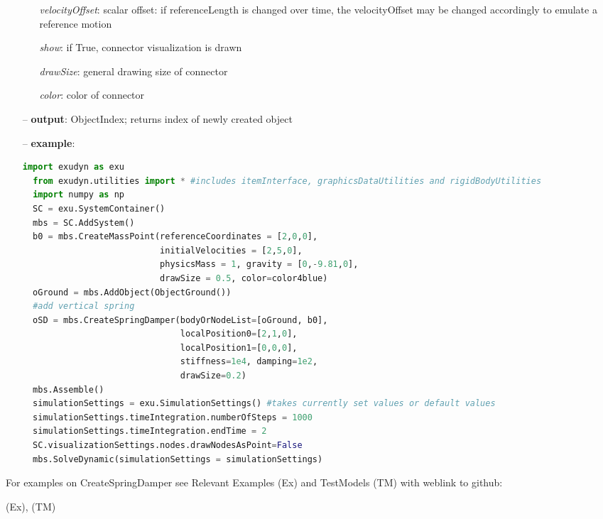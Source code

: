 \begin{itemize}[leftmargin=0.7cm]
\begin{itemize}[leftmargin=1.2cm]
\item[]{\it velocityOffset}: scalar offset: if referenceLength is changed over time, the velocityOffset may be changed accordingly to emulate a reference motion
\item[]{\it show}: if True, connector visualization is drawn
\item[]{\it drawSize}: general drawing size of connector
\item[]{\it color}: color of connector
\end{itemize}
\item[--]
{\bf output}: ObjectIndex; returns index of newly created object
\item[--]
{\bf example}: \vspace{-12pt}\ei\begin{lstlisting}[language=Python, xleftmargin=36pt]
  import exudyn as exu
  from exudyn.utilities import * #includes itemInterface, graphicsDataUtilities and rigidBodyUtilities
  import numpy as np
  SC = exu.SystemContainer()
  mbs = SC.AddSystem()
  b0 = mbs.CreateMassPoint(referenceCoordinates = [2,0,0],
                           initialVelocities = [2,5,0],
                           physicsMass = 1, gravity = [0,-9.81,0],
                           drawSize = 0.5, color=color4blue)
  oGround = mbs.AddObject(ObjectGround())
  #add vertical spring
  oSD = mbs.CreateSpringDamper(bodyOrNodeList=[oGround, b0],
                               localPosition0=[2,1,0],
                               localPosition1=[0,0,0],
                               stiffness=1e4, damping=1e2,
                               drawSize=0.2)
  mbs.Assemble()
  simulationSettings = exu.SimulationSettings() #takes currently set values or default values
  simulationSettings.timeIntegration.numberOfSteps = 1000
  simulationSettings.timeIntegration.endTime = 2
  SC.visualizationSettings.nodes.drawNodesAsPoint=False
  mbs.SolveDynamic(simulationSettings = simulationSettings)
\end{lstlisting}\vspace{-24pt}\bi\item[]\vspace{-24pt}\vspace{12pt}\end{itemize}
%

%
\noindent For examples on CreateSpringDamper see Relevant Examples (Ex) and TestModels (TM) with weblink to github:
\bi
 \item \footnotesize {} (Ex), 
 (TM)
\ei

